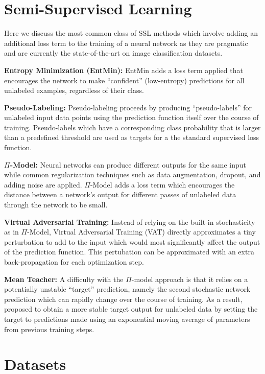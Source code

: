\documentclass{article} \usepackage{iclr2020_conference,times}
\begin{document}
\section{Semi-Supervised Learning}
Here we discuss the most common class of SSL methods which involve adding an additional loss term to the training of a neural network as they are pragmatic and are currently the state-of-the-art on image classification datasets.

\textbf{Entropy Minimization (EntMin):}
EntMin \cite{grandvalet2005semi} adds a loss term applied that encourages the network to make ``confident'' (low-entropy) predictions for all unlabeled examples, regardless of their class.

\textbf{Pseudo-Labeling:}
Pseudo-labeling \cite{lee2013pseudo} proceeds by producing ``pseudo-labels'' for unlabeled input data points using the prediction function itself over the course of training. Pseudo-labels which have a corresponding class probability that is larger than a predefined threshold are used as targets for a the standard supervised loss function.

\textbf{$\Pi$-Model:}
Neural networks can produce different outputs for the same input while common regularization techniques such as data augmentation, dropout, and adding noise are applied. $\Pi$-Model \cite{laine2016temporal,sajjadi2016mutual} adds a loss term which encourages the distance between a network's output for different passes of unlabeled data through the network to be small.

\textbf{Virtual Adversarial Training:} Instead of relying on the built-in stochasticity as in $\Pi$-Model, Virtual Adversarial Training (VAT) \cite{miyato2018virtual} directly approximates a tiny perturbation to add to the input which would most significantly affect the output of the prediction function. This pertubation can be approximated with an extra back-propagation for each optimization step.

\textbf{Mean Teacher:}
A difficulty with the $\Pi$-model approach is that it relies on a potentially unstable ``target'' prediction, namely the second stochastic network prediction which can rapidly change over the course of training. As a result, \cite{tarvainen2017mean} proposed to obtain a more stable target output for unlabeled data by setting the target to predictions made using an exponential moving average of parameters from previous training steps.

\section{Datasets}
\end{document}

